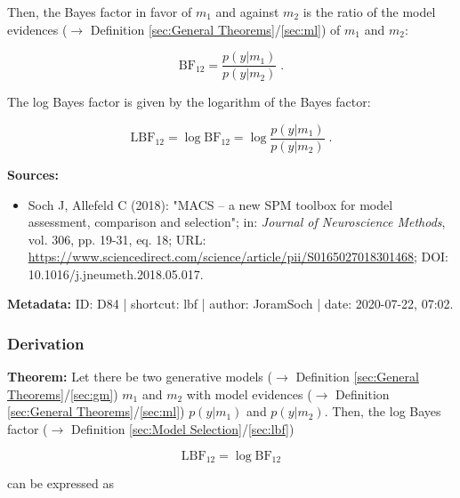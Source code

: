 \documentclass[a4paper,12pt,twoside]{book}
\begin{document}
Then, the Bayes factor in favor of $m_1$ and against $m_2$ is the ratio of the model evidences ($\rightarrow$ Definition \ref{sec:General Theorems}/\ref{sec:ml}) of $m_1$ and $m_2$:

\begin{equation} \label{eq:lbf-bf}
\mathrm{BF}_{12} = \frac{p(y|m_1)}{p(y|m_2)} \; .
\end{equation}

The log Bayes factor is given by the logarithm of the Bayes factor:

\begin{equation} \label{eq:lbf-lbf}
\mathrm{LBF}_{12} = \log \mathrm{BF}_{12} = \log \frac{p(y|m_1)}{p(y|m_2)} \; .
\end{equation}


\vspace{1em}
\textbf{Sources:}
\begin{itemize}
\item Soch J, Allefeld C (2018): "MACS – a new SPM toolbox for model assessment, comparison and selection"; in: \textit{Journal of Neuroscience Methods}, vol. 306, pp. 19-31, eq. 18; URL: \url{https://www.sciencedirect.com/science/article/pii/S0165027018301468}; DOI: 10.1016/j.jneumeth.2018.05.017.
\end{itemize}


\vspace{1em}
\textbf{Metadata:} ID: D84 | shortcut: lbf | author: JoramSoch | date: 2020-07-22, 07:02.
\vspace{1em}



\subsubsection[\textbf{Derivation}]{Derivation} \label{sec:lbf-der}
\setcounter{equation}{0}

\textbf{Theorem:} Let there be two generative models ($\rightarrow$ Definition \ref{sec:General Theorems}/\ref{sec:gm}) $m_1$ and $m_2$ with model evidences ($\rightarrow$ Definition \ref{sec:General Theorems}/\ref{sec:ml}) $p(y \vert m_1)$ and $p(y \vert m_2)$. Then, the log Bayes factor ($\rightarrow$ Definition \ref{sec:Model Selection}/\ref{sec:lbf})

\begin{equation} \label{eq:lbf-der-LBF-term}
\mathrm{LBF}_{12} = \log \mathrm{BF}_{12}
\end{equation}

can be expressed as
\end{document}
